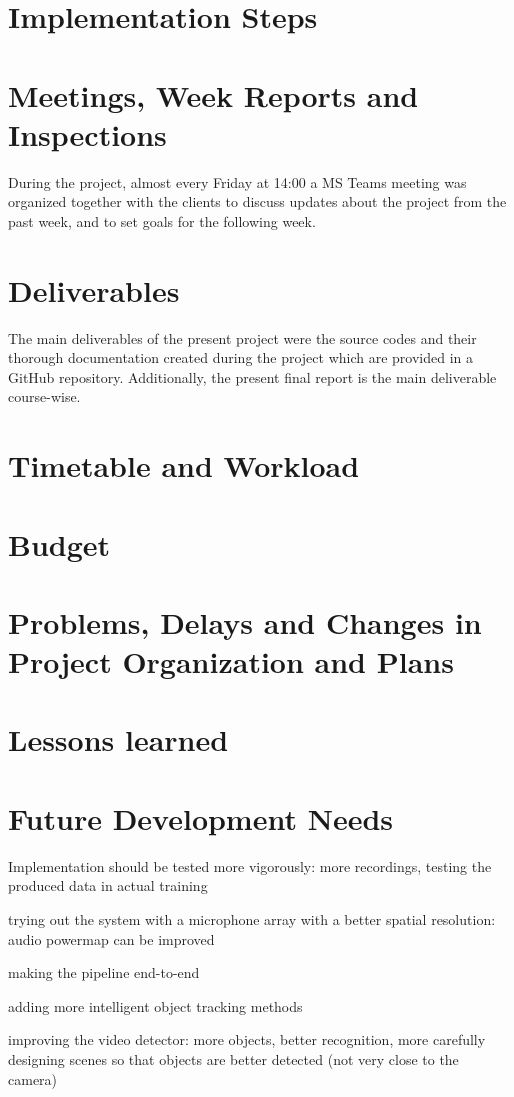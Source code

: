 \section{Implementation Steps} \label{sec_implementation_steps}

\section{Meetings, Week Reports and Inspections}

During the project, almost every Friday at 14:00 a MS Teams meeting was organized together with the clients to discuss updates about the project from the past week, and to set goals for the following week.

\section{Deliverables}

The main deliverables of the present project were the source codes and their thorough documentation created during the project which are provided in a GitHub repository. Additionally, the present final report is the main deliverable course-wise.

\section{Timetable and Workload}

\section{Budget}

\section{Problems, Delays and Changes in Project Organization and Plans}

\section{Lessons learned}

\section{Future Development Needs}

Implementation should be tested more vigorously: more recordings, testing the produced data in actual training

trying out the system with a microphone array with a better spatial resolution: audio powermap can be improved

making the pipeline end-to-end

adding more intelligent object tracking methods

improving the video detector: more objects, better recognition, more carefully designing scenes so that objects are better detected (not very close to the camera)


